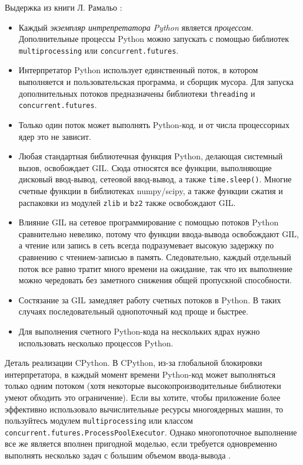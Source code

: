 \documentclass[%
	11pt,
	a4paper,
	utf8,
		]{article}
\begin{document}
Выдержка из книги Л. Рамальо \cite[]{ramalho:python-2022}:
\begin{itemize}
	\item Каждый \emph{экземпляр интрепретатора Python} является \emph{процессом}. Дополнительные процессы Python можно запускать с помощью библиотек \texttt{multiprocessing} или \texttt{concurrent.futures}. 
	
	\item Интерпретатор Python использует единственный поток, в котором выполняется и пользовательская программа, и сборщик мусора. Для запуска дополнительных потоков предназначены библиотеки \texttt{threading} и \texttt{concurrent.futures}.
	
	\item Только один поток может выполнять Python-код, и от числа процессорных ядер это не зависит.
	
	\item Любая стандартная библиотечная функция Python, делающая системный вызов, освобождает GIL. Сюда относятся все функции, выполняющие дисковый ввод-вывод, сетеовой ввод-вывод, а также \texttt{time.sleep()}. Многие счетные функции в библиотеках numpy/scipy, а также функции сжатия и распаковки из модулей \texttt{zlib} и \texttt{bz2} также освобождают GIL.
	
	\item Влияние GIL на сетевое программирование с помощью потоков Python сравнительно невелико, потому что функции ввода-вывода освобождают GIL, а чтение или запись в сеть всегда подразумевает высокую задержку по сравнению с чтением-записью в память. Следовательно, каждый отдельный поток все равно тратит много времени на ожидание, так что их выполнение можно чередовать без заметного снижения общей пропускной способности.
	
	\item Состязание за GIL замедляет работу счетных потоков в Python. В таких случаях последовательный однопоточный код проще и быстрее.
	
	\item Для выполнения счетного Python-кода на нескольких ядрах нужно использовать несколько процессов Python.
\end{itemize}

Деталь реализации CPython. В CPython, из-за глобальной блокировки интерпретатора, в каждый момент времени Python-код может выполняться только одним потоком (хотя некоторые высокопроизводительные библиотеки умеют обходить это ограничение). Если вы хотите, чтобы приложение более эффективно использовало вычислительные ресурсы многоядерных машин, то пользуйтесь модулем \texttt{multiprocessing} или классом \texttt{concurrent.futures.ProcessPoolExecutor}. Однако многопоточное выполнение все же является вполнен пригодной моделью, если требуется одновременно выполнять несколько задач с большим объемом ввода-вывода \cite[]{ramalho:python-2022}.
\end{document}

